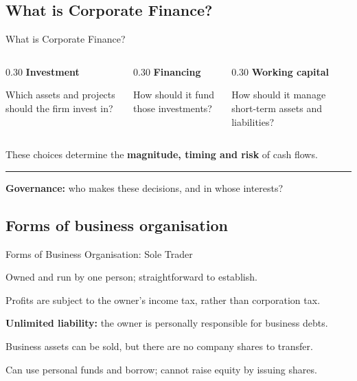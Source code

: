 \documentclass[9pt,aspectratio=169]{beamer}
\newenvironment{wideitemize}{\itemize\addtolength{\itemsep}{10pt}}{\enditemize}
\begin{document}
\subsection{What is Corporate Finance?}
\begin{frame}{What is Corporate Finance?}
\begin{columns}[T,onlytextwidth]
\begin{column}{0.30\textwidth}
\textcolor{StAndrewsBlue}{\textbf{Investment}}\par\smallskip
Which assets and projects should the firm invest in?
\end{column}
\begin{column}{0.30\textwidth}
\textcolor{StAndrewsBlue}{\textbf{Financing}}\par\smallskip
How should it fund those investments?
\end{column}
\begin{column}{0.30\textwidth}
\textcolor{StAndrewsBlue}{\textbf{Working capital}}\par\smallskip
How should it manage short-term assets and liabilities?
\end{column}
\end{columns}
\vspace{1.4em}
These choices determine the \textbf{magnitude, timing and risk} of cash flows.
\par\vspace{0.8em}
\textcolor{StAndrewsBlue}{\rule{\textwidth}{0.4pt}}\par\smallskip
\textbf{Governance:} who makes these decisions, and in whose interests?
\end{frame}

\subsection{Forms of business organisation}
\begin{frame}{Forms of Business Organisation: Sole Trader}
\begin{wideitemize}
\item Owned and run by one person; straightforward to establish.
\item Profits are subject to the owner's income tax, rather than corporation tax.
\item \textbf{Unlimited liability:} the owner is personally responsible for business debts.
\item Business assets can be sold, but there are no company shares to transfer.
\item Can use personal funds and borrow; cannot raise equity by issuing shares.
\end{wideitemize}
\end{frame}
\end{document}
